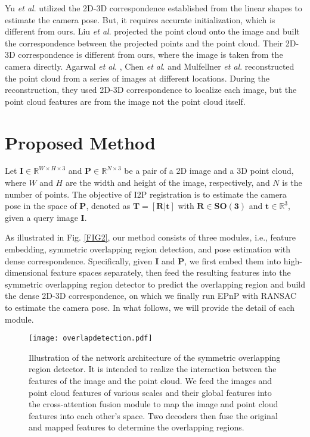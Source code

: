 \documentclass[lettersize,journal]{IEEEtran}
\begin{document}
Yu \textit{et al}. \cite{2D3DCORR} utilized the 2D-3D correspondence established from the linear shapes to estimate the camera pose. But, it requires accurate initialization, which is different from ours. Liu \textit{et al}. \cite{2D3DCORR2} projected the point cloud onto the image and built the correspondence between the projected points and the point cloud. Their 2D-3D correspondence is different from ours, where the image is taken from the camera directly. Agarwal \textit{et al}. \cite{SFM}, Chen \textit{et al}. \cite{overtime1} and Mulfellner \textit{et al}. \cite{overtime2} reconstructed the point cloud from a series of images at different locations. During the reconstruction, they used 2D-3D correspondence to localize each image, but the point cloud features are from the image not the point cloud itself. 





\section{Proposed Method}
\label{sec:proposed}





Let $\mathbf{I} \in \mathbb{R}^{W\times H\times 3}$ and $\mathbf{P} \in \mathbb{R}^{N\times 3}$ be a pair of a 2D image and a 3D point cloud, where $W$ and $H$ are the width and height of the image, respectively, and $N$ is the number of points. The objective of I2P registration is to estimate the camera pose in the space of $\mathbf{P}$, denoted as $\mathbf{T} =[\mathbf{R} |\mathbf{t} ]$ with $\mathbf{R} \in \mathbf{SO(3)}$ and $\mathbf{t} \in \mathbb{R}^{3}$, given a query image $\mathbf{I}$. 

As illustrated in Fig. \ref{FIG2}, our method consists of three modules, i.e., feature embedding, symmetric overlapping region detection, and pose estimation with dense correspondence. Specifically, given $\mathbf{I}$ and $\mathbf{P}$, we first embed them into high-dimensional feature spaces separately, then feed the resulting features into the symmetric overlapping region detector to predict the overlapping region and build the dense 2D-3D correspondence, on which we finally run EPnP \cite{EPNP} with RANSAC \cite{RANSAC} to estimate the camera pose. In what follows, we will provide the detail of each module.

\begin{figure*}
\texttt{[image: overlapdetection.pdf]}
\caption{Illustration of the network architecture of the symmetric overlapping region detector. 
It is intended to realize the interaction between the features of the image and the point cloud. We feed the images and point cloud features of various scales and their global features into the cross-attention fusion module to map the image and point cloud features into each other's space.  Two decoders then fuse the original and mapped features to determine the overlapping regions.}

\label{FIG3}
\end{figure*}
\end{document}
